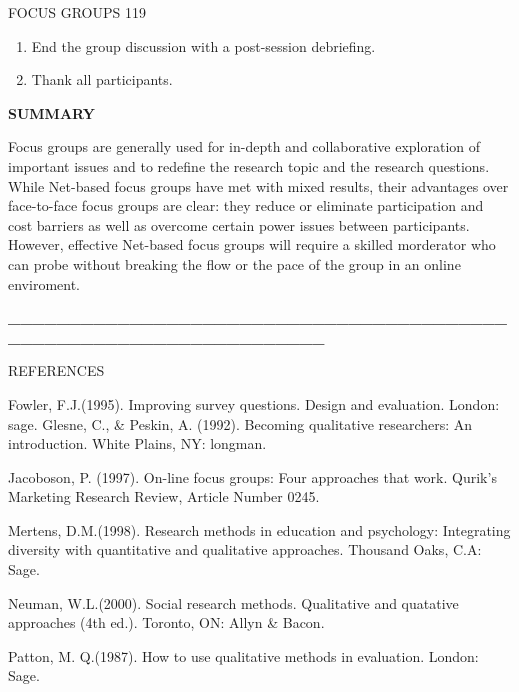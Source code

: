 \noindent                                                                                                            FOCUS GROUPS      119

\noindent 

\begin{enumerate}
\item  End the group discussion with a post-session debriefing.

\item  Thank all participants.
\end{enumerate}

\noindent 

\noindent 

\noindent \textbf{SUMMARY}

\noindent 

\noindent       Focus groups are generally used for in-depth and collaborative exploration of important issues and to redefine the research topic and the research questions. While Net-based focus groups have met with mixed results, their advantages over face-to-face focus groups are clear: they reduce or eliminate participation and cost barriers as well as overcome certain power issues between participants. However, effective Net-based focus groups will require a skilled morderator who can probe without breaking the flow or the pace of the group in an online enviroment.

\noindent          \textbf{\_\_\_\_\_\_\_\_\_\_\_\_\_\_\_\_\_\_\_\_\_\_\_\_\_\_\_\_\_\_\_\_\_\_\_\_\_\_\_\_\_\_\_\_\_\_\_\_\_\_\_\_\_\_\_\_\_\_\_\_\_\_\_\_\_\_\_             }

\noindent REFERENCES

\noindent Fowler, F.J.(1995). Improving survey questions. Design and evaluation. London: sage. Glesne, C., \& Peskin, A. (1992). Becoming qualitative researchers: An introduction. White Plains, NY: longman.

\noindent Jacoboson, P. (1997). On-line focus groups: Four approaches that work. Qurik's Marketing Research Review, Article Number 0245.

\noindent Mertens, D.M.(1998). Research methods in education and psychology: Integrating diversity with quantitative and qualitative approaches. Thousand Oaks, C.A: Sage.

\noindent Neuman, W.L.(2000). Social research methods. Qualitative and quatative approaches (4th ed.). Toronto, ON: Allyn \& Bacon.

\noindent Patton, M. Q.(1987). How to use qualitative methods in evaluation. London: Sage.

